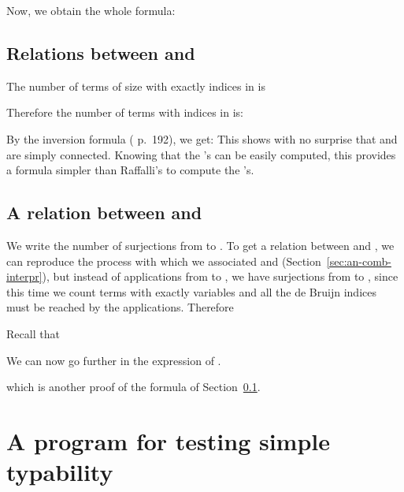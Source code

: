 \documentclass{jfp1}
\begin{document}
Now, we obtain the whole formula:


\subsection{Relations between  and }
\label{sec:relat-betw}

The number of terms of size  with exactly  indices in  is

Therefore the number of terms with indices in  is:

By the inversion formula (\cite{GraKnuPat} p.~192), we get:
 This shows
with no surprise that  and  are simply connected.  Knowing
that the 's can be easily computed, this provides a formula simpler than
Raffalli's to compute the 's.

\subsection{A relation between  and }
We write  the number of surjections from  to .
To get a relation between  and , we can reproduce the process with
which we associated  and  (Section~\ref{sec:an-comb-interpr}), but
instead of applications from  to , we have surjections from 
to , since this time we count terms with exactly  variables and all the de
Bruijn indices must be reached by the applications.  Therefore

Recall that

We can now go further in the expression of .

which is another proof of the formula of Section~\ref{sec:relat-betw}.

\section{A program for testing simple typability}
\label{sec:typ_prog}
\end{document}
